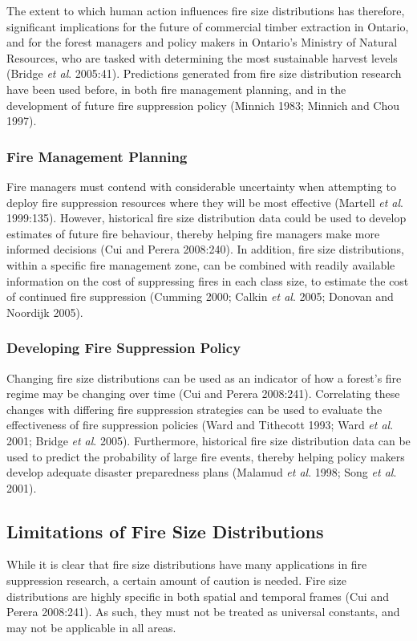 \begin{spacing}{1.5}
\noindent The extent to which human action influences fire size distributions has therefore, significant implications for the future of commercial timber extraction in Ontario, and for the forest managers and policy makers in Ontario's Ministry of Natural Resources, who are tasked with determining the most sustainable harvest levels (Bridge \emph{et al}. 2005:41). Predictions generated from fire size distribution research have been used before, in both fire management planning, and in the development of future fire suppression policy (Minnich 1983; Minnich and Chou 1997).

\subsubsection{Fire Management Planning}
Fire managers must contend with considerable uncertainty when attempting to deploy fire suppression resources where they will be most effective (Martell \emph{et al}. 1999:135). However, historical fire size distribution data could be used to develop estimates of future fire behaviour, thereby helping fire managers make more informed decisions (Cui and Perera 2008:240). In addition, fire size distributions, within a specific fire management zone, can be combined with readily available information on the cost of suppressing fires in each class size, to estimate the cost of continued fire suppression (Cumming 2000; Calkin \emph{et al}. 2005; Donovan and Noordijk 2005).

\subsubsection{Developing Fire Suppression Policy}
Changing fire size distributions can be used as an indicator of how a forest's fire regime may be changing over time (Cui and Perera 2008:241). Correlating these changes with differing fire suppression strategies can be used to evaluate the effectiveness of fire suppression policies (Ward and Tithecott 1993; Ward \emph{et al}. 2001; Bridge \emph{et al}. 2005). Furthermore, historical fire size distribution data can be used to predict the probability of large fire events, thereby helping policy makers develop adequate disaster preparedness plans (Malamud \emph{et al}. 1998; Song \emph{et al}. 2001).

\subsection{Limitations of Fire Size Distributions}
While it is clear that fire size distributions have many applications in fire suppression research, a certain amount of caution is needed. Fire size distributions are highly specific in both spatial and temporal frames (Cui and Perera 2008:241). As such, they must not be treated as universal constants, and may not be applicable in all areas.


\end{spacing}
